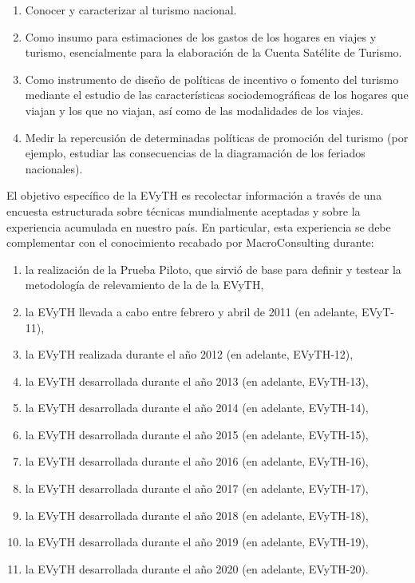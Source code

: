 \documentclass[
  openany]{book}
\providecommand{\tightlist}{%
  \setlength{\itemsep}{0pt}\setlength{\parskip}{0pt}}
\begin{document}
\begin{enumerate}
\def\labelenumi{\arabic{enumi})}
\tightlist
\item
  Conocer y caracterizar al turismo nacional.
\item
  Como insumo para estimaciones de los gastos de los hogares en viajes
  y turismo, esencialmente para la elaboración de la Cuenta Satélite
  de Turismo.
\item
  Como instrumento de diseño de políticas de incentivo o fomento del
  turismo mediante el estudio de las características sociodemográficas
  de los hogares que viajan y los que no viajan, así como de las
  modalidades de los viajes.
\item
  Medir la repercusión de determinadas políticas de promoción del
  turismo (por ejemplo, estudiar las consecuencias de la diagramación
  de los feriados nacionales).
\end{enumerate}

El objetivo específico de la EVyTH es recolectar información a través de
una encuesta estructurada sobre técnicas mundialmente aceptadas y sobre
la experiencia acumulada en nuestro país. En particular, esta
experiencia se debe complementar con el conocimiento recabado por
MacroConsulting durante:

\begin{enumerate}
\def\labelenumi{\arabic{enumi})}
\tightlist
\item
  la realización de la Prueba Piloto, que sirvió de base para definir
  y testear la metodología de relevamiento de la de la EVyTH,
\item
  la EVyTH llevada a cabo entre febrero y abril de 2011 (en adelante,
  EVyT-11),
\item
  la EVyTH realizada durante el año 2012 (en adelante, EVyTH-12),
\item
  la EVyTH desarrollada durante el año 2013 (en adelante, EVyTH-13),
\item
  la EVyTH desarrollada durante el año 2014 (en adelante, EVyTH-14),
\item
  la EVyTH desarrollada durante el año 2015 (en adelante, EVyTH-15),
\item
  la EVyTH desarrollada durante el año 2016 (en adelante, EVyTH-16),
\item
  la EVyTH desarrollada durante el año 2017 (en adelante, EVyTH-17),
\item
  la EVyTH desarrollada durante el año 2018 (en adelante, EVyTH-18),
\item
  la EVyTH desarrollada durante el año 2019 (en adelante, EVyTH-19),
\item
  la EVyTH desarrollada durante el año 2020 (en adelante, EVyTH-20).
\end{enumerate}
\end{document}
